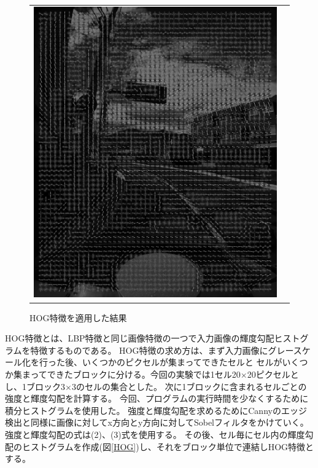 \documentclass[titlepage,dvipdfmx]{jsarticle}
\begin{document}
\begin{figure}[t]
\begin{tabular}{cc}
\begin{minipage}[b]{0.5\linewidth}
      \includegraphics[pagebox=cropbox, scale=0.15]{sotuken_png/dst_HOG2.png}
      \caption{晴れの画像にHOG特徴}
      \label{dstHOG2}
    \end{minipage}
  \end{tabular}
  \caption{HOG特徴を適用した結果}
  \label{HOGimg}
\end{figure}

HOG特徴とは、LBP特徴と同じ画像特徴の一つで入力画像の輝度勾配ヒストグラムを特徴するものである。
HOG特徴の求め方は、まず入力画像にグレースケール化を行った後、いくつかのピクセルが集まってできたセルと
セルがいくつか集まってできたブロックに分ける。今回の実験では1セル20$\times$20ピクセルとし、1ブロック3$\times$3のセルの集合とした。
次に1ブロックに含まれるセルごとの強度と輝度勾配を計算する。
今回、プログラムの実行時間を少なくするために積分ヒストグラムを使用した。\cite{f6}
強度と輝度勾配を求めるためにCannyのエッジ検出と同様に画像に対してx方向とy方向に対してSobelフィルタをかけていく。
強度と輝度勾配の式は(2)、(3)式を使用する。
その後、セル毎にセル内の輝度勾配のヒストグラムを作成(図\ref{HOG})し、それをブロック単位で連結しHOG特徴とする。\cite{f7}
\end{document}
